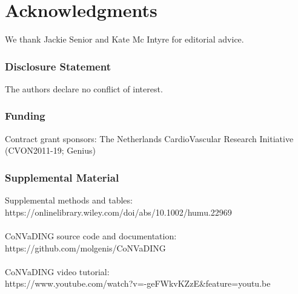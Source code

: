 \section*{Acknowledgments}\label{Acknowledgments} 
We thank Jackie Senior and Kate Mc Intyre for editorial advice.


\subsubsection{Disclosure Statement} 
The authors declare no conflict of interest.

\subsubsection{Funding}
Contract grant sponsors: The Netherlands CardioVascular Research Initiative (CVON2011-19; Genius)

\subsubsection{Supplemental Material}
Supplemental methods and tables: \\ https://onlinelibrary.wiley.com/doi/abs/10.1002/humu.22969 \\
\\
CoNVaDING source code and documentation: \\ https://github.com/molgenis/CoNVaDING  \\
\\
CoNVaDING video tutorial: \\ https://www.youtube.com/watch?v=-geFWkvKZzE\&feature=youtu.be